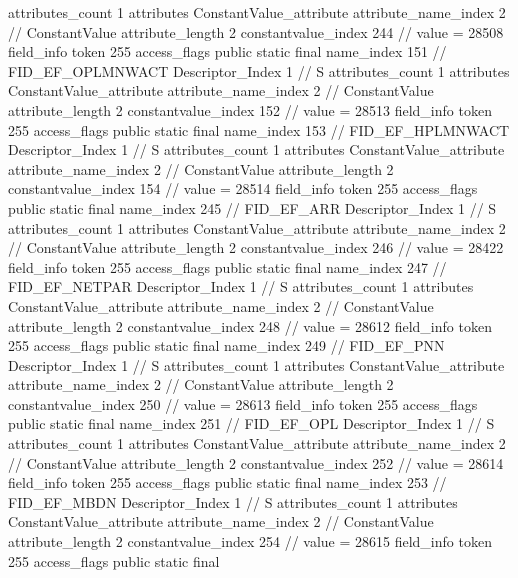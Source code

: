 {{{{{				attributes_count	1
				attributes {
				ConstantValue_attribute {
					attribute_name_index	2		// ConstantValue
					attribute_length	2
					constantvalue_index	244		// value = 28508
				}
				}
			}
			field_info {
				token	255
				access_flags	public static final
				name_index	151		// FID_EF_OPLMNWACT
				Descriptor_Index	1		// S
				attributes_count	1
				attributes {
				ConstantValue_attribute {
					attribute_name_index	2		// ConstantValue
					attribute_length	2
					constantvalue_index	152		// value = 28513
				}
				}
			}
			field_info {
				token	255
				access_flags	public static final
				name_index	153		// FID_EF_HPLMNWACT
				Descriptor_Index	1		// S
				attributes_count	1
				attributes {
				ConstantValue_attribute {
					attribute_name_index	2		// ConstantValue
					attribute_length	2
					constantvalue_index	154		// value = 28514
				}
				}
			}
			field_info {
				token	255
				access_flags	public static final
				name_index	245		// FID_EF_ARR
				Descriptor_Index	1		// S
				attributes_count	1
				attributes {
				ConstantValue_attribute {
					attribute_name_index	2		// ConstantValue
					attribute_length	2
					constantvalue_index	246		// value = 28422
				}
				}
			}
			field_info {
				token	255
				access_flags	public static final
				name_index	247		// FID_EF_NETPAR
				Descriptor_Index	1		// S
				attributes_count	1
				attributes {
				ConstantValue_attribute {
					attribute_name_index	2		// ConstantValue
					attribute_length	2
					constantvalue_index	248		// value = 28612
				}
				}
			}
			field_info {
				token	255
				access_flags	public static final
				name_index	249		// FID_EF_PNN
				Descriptor_Index	1		// S
				attributes_count	1
				attributes {
				ConstantValue_attribute {
					attribute_name_index	2		// ConstantValue
					attribute_length	2
					constantvalue_index	250		// value = 28613
				}
				}
			}
			field_info {
				token	255
				access_flags	public static final
				name_index	251		// FID_EF_OPL
				Descriptor_Index	1		// S
				attributes_count	1
				attributes {
				ConstantValue_attribute {
					attribute_name_index	2		// ConstantValue
					attribute_length	2
					constantvalue_index	252		// value = 28614
				}
				}
			}
			field_info {
				token	255
				access_flags	public static final
				name_index	253		// FID_EF_MBDN
				Descriptor_Index	1		// S
				attributes_count	1
				attributes {
				ConstantValue_attribute {
					attribute_name_index	2		// ConstantValue
					attribute_length	2
					constantvalue_index	254		// value = 28615
				}
				}
			}
			field_info {
				token	255
				access_flags	public static final
}}}}}
